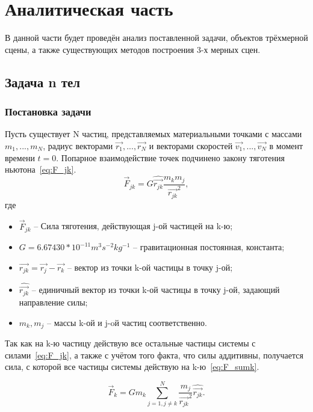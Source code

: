 \chapter{Аналитическая часть}

В данной части будет проведён анализ поставленной задачи, объектов трёхмерной сцены, а также существующих методов построения 3-х мерных сцен.

\section{Задача n тел}
\subsection*{Постановка задачи}
Пусть существует N частиц, представляемых материальными точками с массами $m_1, ..., m_N$, радиус векторами $\vec{r_1}, ..., \vec{r_N}$ и векторами скоростей $\vec{v_1}, ..., \vec{v_N}$ в момент времени $t=0$.
Попарное взаимодействие точек подчинено закону тяготения ньютона~\ref{eq:F_jk}.
\begin{equation}
	\label{eq:F_jk}
	\vec{F}_{jk} = G\hat{\vec{r_{jk}}}\frac{m_km_j}{\vec{r_{jk}}^2},
\end{equation}
где
\begin{itemize}
	\item $\vec{F}_{jk}$ -- Сила тяготения, действующая j-ой частицей на k-ю;
	\item $G = 6.67430 * 10^{-11} m^3s^{-2}kg^{-1}$ -- гравитационная постоянная, константа;
	\item $\vec{r_{jk}} = \vec{r_j} - \vec{r_k}$ -- вектор из точки k-ой частицы в точку j-ой;
	\item $\hat{\vec{r_{jk}}}$ -- единичный вектор из точки k-ой частицы в точку j-ой, задающий направление силы;
	\item $m_k, m_j$ -- массы k-ой и j-oй частиц соответственно.
\end{itemize}

Так как на k-ю частицу действую все остальные частицы системы с силами~\ref{eq:F_jk}, а также с учётом того факта, что силы аддитивны, получается сила, с которой все частицы системы действую на k-ю~\ref{eq:F_sumk}. 

\begin{equation}
	\label{eq:F_sumk}
	\vec{F}_{k} = Gm_k\sum_{j=1, j \neq k}^{N}{\frac{m_j}{\vec{r_{jk}}^2}\hat{\vec{r_{jk}}}}.
\end{equation}

